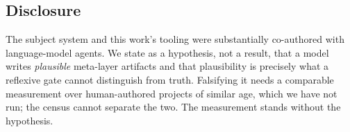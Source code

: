 \documentclass[10pt,conference]{IEEEtran}
\begin{document}
\subsection{Disclosure}

The subject system and this work's tooling were substantially co-authored with
language-model agents. We state as a hypothesis, not a result, that a model writes
\emph{plausible} meta-layer artifacts and that plausibility is precisely what a reflexive
gate cannot distinguish from truth. Falsifying it needs a comparable measurement over
human-authored projects of similar age, which we have not run; the census cannot separate
the two. The measurement stands without the hypothesis.

\label{refsstart}


\end{document}
